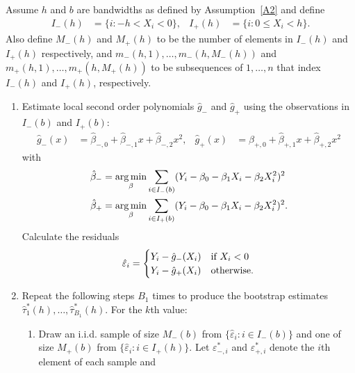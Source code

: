 \documentclass[12pt,fleqn]{article}
\begin{document}
\begin{algorithm}\label{Alg1}
  Assume $h$ and $b$ are bandwidths as defined by Assumption~\ref{A2} and define
  \begin{align*}
    I_{-}(h) &= \{i : -h < X_{i} < 0\}, &
    I_{+}(h) &= \{i : 0 \leq X_{i} < h\}.
  \end{align*}
  Also define $M_{-}(h)$ and $M_{+}(h)$ to be the number of elements in $I_{-}(h)$ and
  $I_{+}(h)$ respectively, and $m_{-}(h,1),\dots,m_{-}(h,M_{-}(h))$ and
  $m_{+}(h,1),\dots,m_{+}(h,M_+(h))$ to be subsequences of $1,\dots,n$ that index
  $I_{-}(h)$ and $I_{+}(h)$, respectively.
  \begin{enumerate}
  \item Estimate local second order polynomials $\hat g_{-}$ and $\hat g_{+}$ using
    the observations in $I_{-}(b)$ and $I_{+}(b)$:
    \begin{align}
      \label{eq:2}
      \hat g_{-}(x)
      &= \hat\beta_{-,0} + \hat\beta_{-,1} x + \hat\beta_{-,2} x^{2},
      &\hat g_{+}(x)
      &= \hat\beta_{+,0} + \hat\beta_{+,1} x + \hat\beta_{+,2} x^{2}
    \end{align}
    with
    \begin{align*}
      \hat\beta_{-} &= \operatorname*{arg\,min}_\beta \sum_{i \in I_-(b)}
      (Y_i - \beta_0 - \beta_1 X_i - \beta_2 X_i^2)^2 \\
      \hat\beta_{+} &= \operatorname*{arg\,min}_\beta \sum_{i \in I_+(b)}
      (Y_i - \beta_0 - \beta_1 X_i - \beta_2 X_i^2)^2.
    \end{align*}
    Calculate the residuals
    \begin{equation}
      \label{eq:3}
      \hat\varepsilon_{i} =
      \begin{cases}
        Y_{i} - \hat g_-(X_{i}) & \text{if}\ X_{i} < 0 \\
        Y_{i} - \hat g_+(X_{i}) & \text{otherwise}.
      \end{cases}
    \end{equation}
  \item Repeat the following steps $B_{1}$ times to produce the
    bootstrap estimates $\hat{\tau}_{1}^{*}(h),\dots,\hat\tau_{B_{1}}^{*}(h)$. For the
    $k$th value:
    \begin{enumerate}
    \item Draw an i.i.d. sample of size $M_-(b)$ from
      $\{\hat\varepsilon_i : i \in I_-(b)\}$ and one of size $M_+(b)$ from
      $\{\hat\varepsilon_i : i \in I_+(h)\}$. Let $\varepsilon_{-,i}^{*}$ and
      $\varepsilon_{+,i}^{*}$ denote the $i$th element of each sample and

\end{enumerate}
\end{enumerate}
\end{algorithm}
\end{document}
